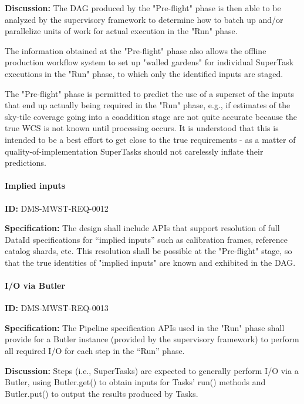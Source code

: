 \documentclass[SE,toc,lsstdraft]{lsstdoc}
\begin{document}
\textbf{Discussion:}
The DAG produced by the "Pre-flight" phase is then able to be analyzed by the supervisory framework to determine how to batch up and/or parallelize units of work for actual execution in the "Run" phase.

The information obtained at the "Pre-flight" phase also allows the offline production workflow system to set up "walled gardens" for individual SuperTask executions in the "Run" phase, to which only the identified inputs are staged.

The "Pre-flight" phase is permitted to predict the use of a superset of the inputs that end up actually being required in the "Run" phase, e.g., if estimates of the sky-tile coverage going into a coaddition stage are not quite accurate because the true WCS is not known until processing occurs. It is understood that this is intended to be a best effort to get close to the true requirements - as a matter of quality-of-implementation SuperTasks should not carelessly inflate their predictions.

\paragraph{Implied inputs}\hfill  %

\label{DMS-MWST-REQ-0012}
\textbf{ID:} DMS-MWST-REQ-0012

\textbf{Specification:}
The design shall include APIs that support resolution of full DataId specifications for “implied inputs” such as calibration frames, reference catalog shards, etc. This resolution shall be possible at the "Pre-flight" stage, so that the true identities of "implied inputs" are known and exhibited in the DAG.

\paragraph{I/O via Butler}\hfill  %

\label{DMS-MWST-REQ-0013}
\textbf{ID:} DMS-MWST-REQ-0013

\textbf{Specification:}
The Pipeline specification APIs used in the "Run" phase shall provide for a Butler instance (provided by the supervisory framework) to perform all required I/O for each step in the “Run” phase.

\textbf{Discussion:}
Steps (i.e., SuperTasks) are expected to generally perform I/O via a Butler, using Butler.get() to obtain inputs for Tasks' run() methods and Butler.put() to output the results produced by Tasks.
\end{document}
